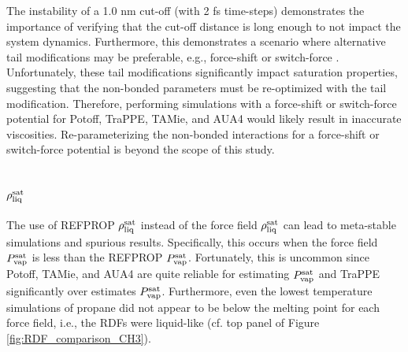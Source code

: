 \documentclass[preprint,review,12pt]{elsarticle}
\begin{document}
	
	
	
	
	The instability of a 1.0 nm cut-off (with 2 fs time-steps) demonstrates the importance of verifying that the cut-off distance is long enough to not impact the system dynamics. Furthermore, this demonstrates a scenario where alternative tail modifications may be preferable, e.g., force-shift or switch-force \cite{GROMACS_2018}. Unfortunately, these tail modifications significantly impact saturation properties, suggesting that the non-bonded parameters must be re-optimized with the tail modification. Therefore, performing simulations with a force-shift or switch-force potential for Potoff, TraPPE, TAMie, and AUA4 would likely result in inaccurate viscosities. Re-parameterizing the non-bonded interactions for a force-shift or switch-force potential is beyond the scope of this study.
	
	\subsection{$\rho_{\rm liq}^{\rm sat}$}
	
	The use of REFPROP $\rho_{\rm liq}^{\rm sat}$ instead of the force field $\rho_{\rm liq}^{\rm sat}$ can lead to meta-stable simulations and spurious results. Specifically, this occurs when the force field $P_{\rm vap}^{\rm sat}$ is less than the REFPROP $P_{\rm vap}^{\rm sat}$. Fortunately, this is uncommon since Potoff, TAMie, and AUA4 are quite reliable for estimating $P_{\rm vap}^{\rm sat}$ and TraPPE significantly over estimates $P_{\rm vap}^{\rm sat}$. Furthermore, even the lowest temperature simulations of propane did not appear to be below the melting point for each force field, i.e., the RDFs were liquid-like (cf. top panel of Figure \ref{fig:RDF_comparison_CH3}). 
	
\end{document}
